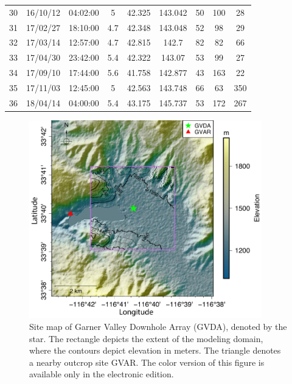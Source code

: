 \begin{table}[!ht]
{\begin{tabular}{@{}ccccccccc@{}}
      30 & 16/10/12        & 04:02:00        & 5     & 42.325       & 143.042       & 50         & 100           & 28          \\
      31 & 17/02/27        & 18:10:00        & 4.7   & 42.348       & 143.048       & 52         & 98            & 29          \\
      32 & 17/03/14        & 12:57:00        & 4.7   & 42.815       & 142.7         & 82         & 82            & 66          \\
      33 & 17/04/30        & 23:42:00        & 5.4   & 42.322       & 143.07        & 53         & 99            & 27          \\
      34 & 17/09/10        & 17:44:00        & 5.6   & 41.758       & 142.877       & 43         & 163           & 22          \\
      35 & 17/11/03        & 12:45:00        & 5     & 42.563       & 143.748       & 66         & 63            & 350         \\
      36 & 18/04/14        & 04:00:00        & 5.4   & 43.175       & 145.737       & 53         & 172           & 267         \\ \bottomrule
    \end{tabular}}
\end{table}



\clearpage
\begin{figure}[!ht]
  \centering
  \includegraphics[width=0.9\textwidth]{figures/figure_etf_1.pdf}
  \caption{Site map of Garner Valley Downhole Array (GVDA), denoted by the star. The rectangle depicts the extent of the modeling domain, where the contours depict elevation in meters. The triangle denotes a nearby outcrop site GVAR. The color version of this figure is available only in the electronic edition.}
  \label{fig:etf-1}
\end{figure}


